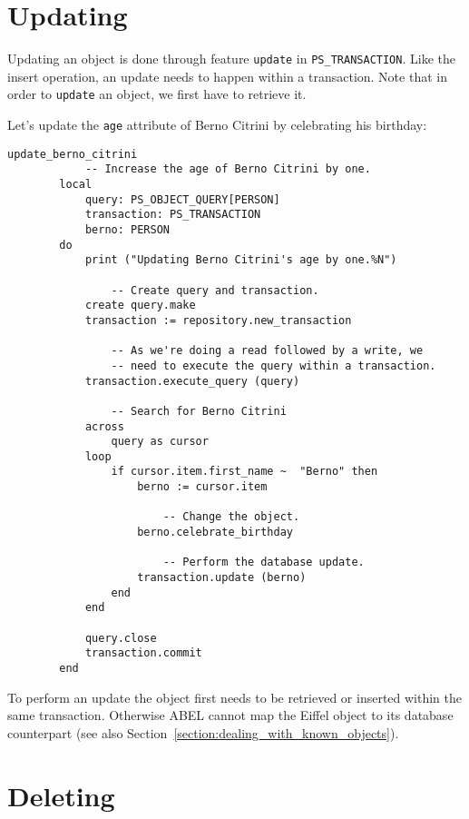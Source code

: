 \documentclass[a4paper,12pt]{report}
\begin{document}
\section{Updating}

Updating an object is done through feature \lstinline{update} in \lstinline{PS_TRANSACTION}.
Like the insert operation, an update needs to happen within a transaction.
Note that in order to \lstinline!update! an object, we first have to retrieve it.

Let's update the \lstinline{age} attribute of Berno Citrini by celebrating his birthday:

\begin{lstlisting}[language=OOSC2Eiffel, captionpos=b, caption={Update Berno Citrini's age.}, label={lst:tutorial_update}]
	update_berno_citrini
			-- Increase the age of Berno Citrini by one.
		local
			query: PS_OBJECT_QUERY[PERSON]
			transaction: PS_TRANSACTION
			berno: PERSON
		do
			print ("Updating Berno Citrini's age by one.%N")

				-- Create query and transaction.
			create query.make
			transaction := repository.new_transaction

				-- As we're doing a read followed by a write, we
				-- need to execute the query within a transaction.
			transaction.execute_query (query)

				-- Search for Berno Citrini
			across
				query as cursor
			loop
				if cursor.item.first_name ~  "Berno" then
					berno := cursor.item

						-- Change the object.
					berno.celebrate_birthday

						-- Perform the database update.
					transaction.update (berno)
				end
			end

			query.close
			transaction.commit
		end

\end{lstlisting}

To perform an update the object first needs to be retrieved or inserted within the same transaction.
Otherwise ABEL cannot map the Eiffel object to its database counterpart (see also Section~\ref{section:dealing_with_known_objects}).

\section{Deleting}
\label{section:simple_delete}
\end{document}
